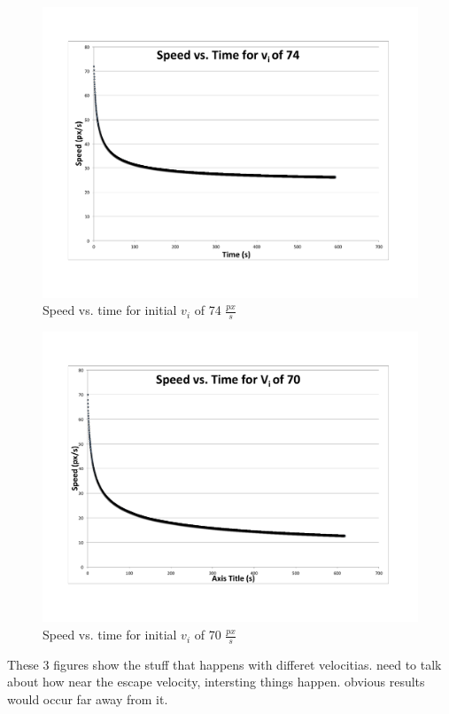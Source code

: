\begin{figure}[h] 
	\centering
		\includegraphics[width=12cm]{Figures/fig2.pdf}

	\caption{Speed vs. time for initial $v_i$ of 74 $\frac{px}{s}$}
	\label{fig:data2}
\end{figure}


\begin{figure}[h] 
	\centering
		\includegraphics[width=12cm]{Figures/fig3.pdf}

	\caption{Speed vs. time for initial $v_i$ of 70 $\frac{px}{s}$}
	\label{fig:data3}
\end{figure}



These 3 figures show the stuff that happens with differet velocitias.  need to talk about how near the escape velocity, intersting things happen.  obvious results would occur far away from it.

